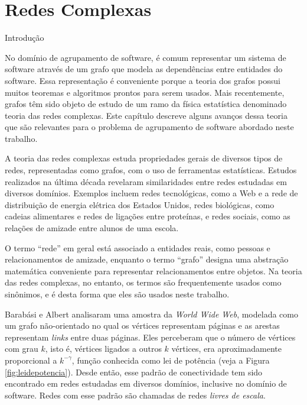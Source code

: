 
\chapter{Redes Complexas} \label{cap:redes}

\begin{section}{Introdução} \label{sec:redes-complexas}

No domínio de agrupamento de software, é comum representar um sistema de software através de um grafo que modela as dependências entre entidades do software. Essa representação é conveniente porque a teoria dos grafos possui muitos teoremas e algoritmos prontos para serem usados. Mais recentemente, grafos têm sido objeto de estudo de um ramo da física estatística denominado teoria das redes complexas. Este capítulo descreve alguns avanços dessa teoria que são relevantes para o problema de agrupamento de software abordado neste trabalho.

A teoria das redes complexas estuda propriedades gerais de diversos tipos de redes, representadas como grafos, com o uso de ferramentas estatísticas. Estudos realizados na última década revelaram similaridades entre redes estudadas em diversos domínios. Exemplos incluem redes tecnológicas, como a Web e a rede de distribuição de energia elétrica dos Estados Unidos, redes biológicas, como cadeias alimentares e redes de ligações entre proteínas, e redes sociais, como as relações de amizade entre alunos de uma escola.

O termo ``rede'' em geral está associado a entidades reais, como pessoas e relacionamentos de amizade, enquanto o termo ``grafo'' designa uma abstração matemática conveniente para representar relacionamentos entre objetos. Na teoria das redes complexas, no entanto, os termos são frequentemente usados como sinônimos, e é desta forma que eles são usados neste trabalho.

Barabási e Albert \cite{Barabasi1999} analisaram uma amostra da \emph{World Wide Web}, modelada como um grafo não-orientado no qual os vértices representam páginas e as arestas representam \emph{links} entre duas páginas. Eles perceberam que o número de vértices com grau $k$, isto é, vértices ligados a outros $k$ vértices, era aproximadamente proporcional a $k^{-\gamma}$, função conhecida como lei de potência (veja a Figura \ref{fig:leidepotencia}). Desde então, esse padrão de conectividade tem sido encontrado em redes estudadas em diversos domínios, inclusive no domínio de software. Redes com esse padrão são chamadas de redes \emph{livres de escala}.


\end{section}

